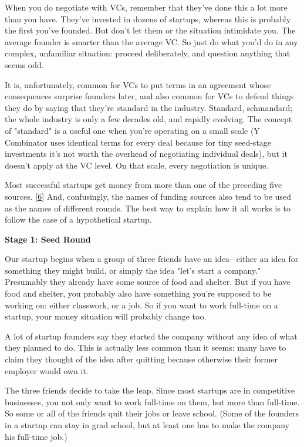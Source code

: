 When you do negotiate with VCs, remember that they've done this a
lot more than you have.  They've invested in dozens of startups,
whereas this is probably the first you've founded.  But don't let
them or the situation intimidate you. The average founder is smarter
than the average VC.  So just do what you'd do in any complex,
unfamiliar situation: proceed deliberately, and question anything
that seems odd.

It is, unfortunately, common for VCs to put terms in an agreement
whose consequences surprise founders later, and also common for VCs
to defend things they do by saying that they're standard in the
industry.  Standard, schmandard; the whole industry is only a few
decades old, and rapidly evolving.  The concept of "standard" is a
useful one when you're operating on a small scale (Y Combinator
uses identical terms for every deal because for tiny seed-stage
investments it's not worth the overhead of negotiating individual
deals), but it doesn't apply at the VC level.  On that scale, every
negotiation is unique.

Most successful startups get money from more than one of the preceding
five sources. 
[\href{\#f6n}{6}]
And, confusingly, the names of funding sources
also tend to be used as the names of different rounds.  The best
way to explain how it all works is to follow the case of a hypothetical
startup.

\textbf{Stage 1: Seed Round}

Our startup begins when a group of three friends have an idea--
either an idea for something they might build, or simply the idea
"let's start a company."  Presumably they already have some source
of food and shelter.  But if you have food and shelter, you probably
also have something you're supposed to be working on: either
classwork, or a job.  So if you want to work full-time on a startup,
your money situation will probably change too.

A lot of startup founders say they started the company without any
idea of what they planned to do.  This is actually less common than
it seems: many have to claim they thought of the idea after quitting
because otherwise their former employer would own it.

The three friends decide to take the leap.  Since most startups are
in competitive businesses, you not only want to work full-time on
them, but more than full-time.  So some or all of the friends quit
their jobs or leave school.  (Some of the founders in a startup can
stay in grad school, but at least one has to make the company his
full-time job.)

